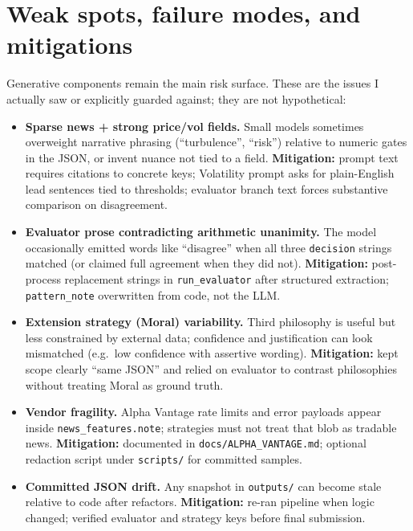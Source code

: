 \documentclass[11pt]{article}
\begin{document}
\section{Weak spots, failure modes, and mitigations}
Generative components remain the main risk surface. These are the issues I actually saw or explicitly guarded against; they are not hypothetical:

\begin{itemize}
  \item \textbf{Sparse news + strong price/vol fields.} Small models sometimes overweight narrative phrasing (``turbulence'', ``risk'') relative to numeric gates in the JSON, or invent nuance not tied to a field. \textbf{Mitigation:} prompt text requires citations to concrete keys; Volatility prompt asks for plain-English lead sentences tied to thresholds; evaluator branch text forces substantive comparison on disagreement.
  \item \textbf{Evaluator prose contradicting arithmetic unanimity.} The model occasionally emitted words like ``disagree'' when all three \texttt{decision} strings matched (or claimed full agreement when they did not). \textbf{Mitigation:} post-process replacement strings in \texttt{run\_evaluator} after structured extraction; \texttt{pattern\_note} overwritten from code, not the LLM.
  \item \textbf{Extension strategy (Moral) variability.} Third philosophy is useful but less constrained by external data; confidence and justification can look mismatched (e.g.\ low confidence with assertive wording). \textbf{Mitigation:} kept scope clearly ``same JSON'' and relied on evaluator to contrast philosophies without treating Moral as ground truth.
  \item \textbf{Vendor fragility.} Alpha Vantage rate limits and error payloads appear inside \texttt{news\_features.note}; strategies must not treat that blob as tradable news. \textbf{Mitigation:} documented in \newline \texttt{docs/ALPHA\_VANTAGE.md}; optional redaction script under \texttt{scripts/} for committed samples.
  \item \textbf{Committed JSON drift.} Any snapshot in \texttt{outputs/} can become stale relative to code after refactors. \textbf{Mitigation:} re-ran pipeline when logic changed; verified evaluator and strategy keys before final submission.
\end{itemize}
\end{document}
